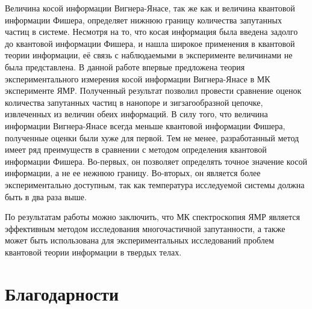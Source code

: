 Величина косой информации Вигнера-Янасе,
так же как и величина квантовой информации Фишера,
определяет нижнюю границу количества запутанных частиц в системе.
Несмотря на то, что косая информация была введена задолго до квантовой информации Фишера,
и нашла широкое применения в квантовой теории информации,
её связь с наблюдаемыми в эксперименте величинами не была представлена.
В данной работе впервые предложена теория экспериментального измерения косой информации Вигнера-Янасе
в МК эксперименте ЯМР.
Полученный результат позволил провести сравнение оценок количества запутанных частиц в нанопоре и зигзагообразной цепочке,
извлеченных из величин обеих информаций.
В силу того, что величина информации Вигнера-Янасе всегда меньше квантовой информации Фишера,
полученные оценки были хуже для первой.
Тем не менее, разработанный метод имеет ряд преимуществ в сравнении с методом определения квантовой информации Фишера.
Во-первых, он позволяет определять точное значение косой информации, а не ее нежнюю границу.
Во-вторых, он является более экспериментально доступным, так как температура исследуемой системы должна быть в два раза выше.


По результатам работы можно заключить,
что МК спектроскопия ЯМР является эффективным методом исследования многочастичной запутанности,
а также может быть использована для экспериментальных исследований проблем квантовой теории информации в твердых телах.

\chapter*{Благодарности}

